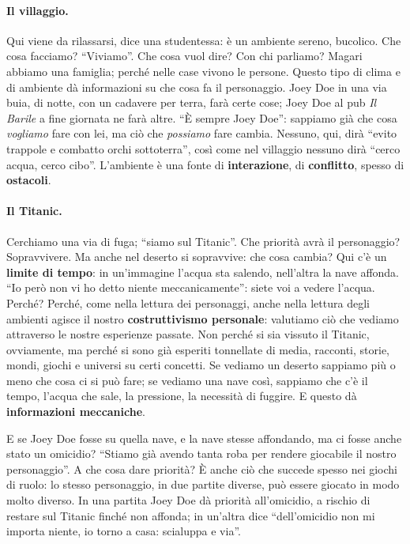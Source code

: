 \paragraph{Il villaggio.} Qui viene da rilassarsi, dice una studentessa: è un ambiente
sereno, bucolico. Che cosa facciamo? ``Viviamo''. Che cosa vuol dire? Con chi
parliamo? Magari abbiamo una famiglia; perché nelle case vivono le persone. Questo
tipo di clima e di ambiente dà informazioni su che cosa fa il personaggio. Joey
Doe in una via buia, di notte, con un cadavere per terra, farà certe cose; Joey Doe
al pub \emph{Il Barile} a fine giornata ne farà altre. ``È sempre Joey Doe'':
sappiamo già che cosa \emph{vogliamo} fare con lei, ma ciò che \emph{possiamo} fare
cambia. Nessuno, qui, dirà ``evito trappole e combatto orchi sottoterra'', così come
nel villaggio nessuno dirà ``cerco acqua, cerco cibo''. L'ambiente è una fonte di
\textbf{interazione}, di \textbf{conflitto}, spesso di \textbf{ostacoli}.

\paragraph{Il Titanic.} Cerchiamo una via di fuga; ``siamo sul Titanic''. Che
priorità avrà il personaggio? Sopravvivere. Ma anche nel deserto si sopravvive:
che cosa cambia? Qui c'è un \textbf{limite di tempo}: in un'immagine l'acqua sta
salendo, nell'altra la nave affonda. ``Io però non vi ho detto niente
meccanicamente'': siete voi a vedere l'acqua. Perché? Perché, come nella lettura dei
personaggi, anche nella lettura degli ambienti agisce il nostro
\textbf{costruttivismo personale}: valutiamo ciò che vediamo attraverso le nostre
esperienze passate. Non perché si sia vissuto il Titanic, ovviamente, ma perché si
sono già esperiti tonnellate di media, racconti, storie, mondi, giochi e universi
su certi concetti. Se vediamo un deserto sappiamo più o meno che cosa ci si può fare;
se vediamo una nave così, sappiamo che c'è il tempo, l'acqua che sale, la
pressione, la necessità di fuggire. E questo dà \textbf{informazioni meccaniche}.

E se Joey Doe fosse su quella nave, e la nave stesse affondando, ma ci fosse anche
stato un omicidio? ``Stiamo già avendo tanta roba per rendere giocabile il nostro
personaggio''. A che cosa dare priorità? È anche ciò che succede spesso nei giochi di
ruolo: lo stesso personaggio, in due partite diverse, può essere giocato in modo
molto diverso. In una partita Joey Doe dà priorità all'omicidio, a rischio di restare
sul Titanic finché non affonda; in un'altra dice ``dell'omicidio non mi importa
niente, io torno a casa: scialuppa e via''.

